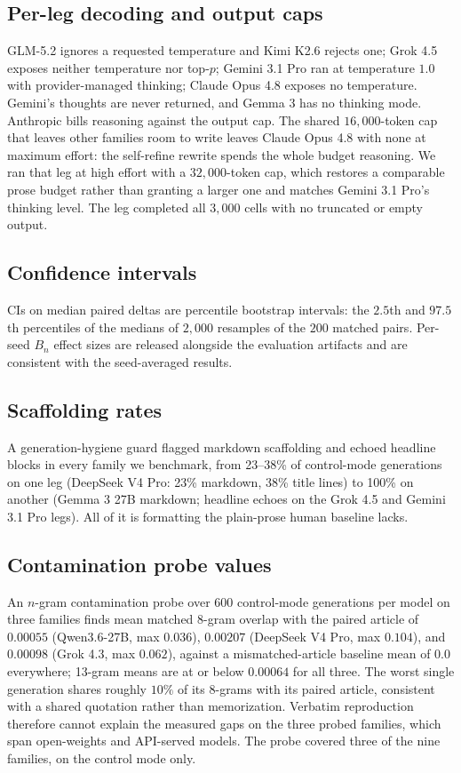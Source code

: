 \documentclass{article}
\begin{document}
\subsection{Per-leg decoding and output caps}
GLM-5.2 ignores a requested temperature and Kimi K2.6 rejects one; Grok 4.5 exposes neither
temperature nor top-$p$; Gemini 3.1 Pro ran at temperature $1.0$ with provider-managed thinking;
Claude Opus 4.8 exposes no temperature. Gemini's thoughts are never returned, and Gemma 3 has
no thinking mode. Anthropic bills reasoning against the output cap. The
shared $16{,}000$-token cap that leaves other families room to write leaves Claude Opus 4.8 with
none at maximum effort: the self-refine rewrite spends the whole budget reasoning. We ran that
leg at high effort with a $32{,}000$-token cap, which restores a comparable prose budget rather
than granting a larger one and matches Gemini 3.1 Pro's thinking level. The leg completed all
$3{,}000$ cells with no truncated or empty output.

\subsection{Confidence intervals}
CIs on median paired deltas are percentile bootstrap intervals: the $2.5$th and $97.5$th
percentiles of the medians of $2{,}000$ resamples of the $200$ matched pairs. Per-seed $B_n$
effect sizes are released alongside the evaluation artifacts and are consistent with the
seed-averaged results.

\subsection{Scaffolding rates}
A generation-hygiene guard flagged markdown scaffolding and echoed headline blocks in every
family we benchmark, from 23--38\% of control-mode generations on one leg (DeepSeek V4 Pro:
23\% markdown, 38\% title lines) to 100\% on another (Gemma 3 27B markdown; headline echoes on
the Grok 4.5 and Gemini 3.1 Pro legs). All of it is formatting the plain-prose human baseline
lacks.

\subsection{Contamination probe values}
An $n$-gram contamination probe over $600$ control-mode generations per model on three families
finds mean matched 8-gram overlap with the paired article of $0.00055$ (Qwen3.6-27B, max
$0.036$), $0.00207$ (DeepSeek V4 Pro, max $0.104$), and $0.00098$ (Grok 4.3, max $0.062$),
against a mismatched-article baseline mean of $0.0$ everywhere; 13-gram means are at or below
$0.00064$ for all three. The worst single generation shares roughly $10\%$ of its 8-grams with
its paired article, consistent with a shared quotation rather than memorization. Verbatim
reproduction therefore cannot explain the measured gaps on the three probed families, which
span open-weights and API-served models. The probe covered three of the nine families, on the
control mode only.
\end{document}

